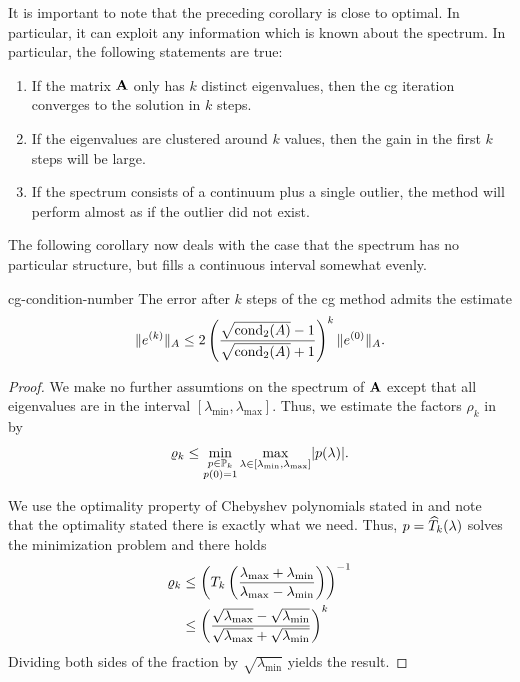 \begin{remark}
  It is important to note that the preceding corollary is close to
  optimal. In particular, it can exploit any information which is
  known about the spectrum. In particular, the following statements are true:
  \begin{enumerate}
  \item If the matrix $\mathbf A$ only has $k$ distinct eigenvalues, then
    the cg iteration converges to the solution in $k$ steps.
  \item If the eigenvalues are clustered around $k$ values, then the
    gain in the first $k$ steps will be large.
  \item If the spectrum consists of a continuum plus a single outlier,
    the method will perform almost as if the outlier did not exist.
  \end{enumerate}
  The following corollary now deals with the case that the spectrum
  has no particular structure, but fills a continuous interval
  somewhat evenly.
\end{remark}

\begin{Corollary}{cg-condition-number}
  The error after $k$ steps of the cg method admits the estimate
  \begin{gather}
    \lVert e^{(k)}\rVert_A \le 2 \left(
      \frac{\sqrt{\operatorname{cond}_2(A)}-1}{\sqrt{\operatorname{cond}_2(A)}+1}\right)^k
    \lVert e^{(0)}\rVert_A.
  \end{gather}
\end{Corollary}

\begin{proof}
  We make no further assumtions on the spectrum of $\mathbf A$ except that
  all eigenvalues are in the interval
  $[\lambda_{\min},\lambda_{\max}]$. Thus, we estimate the factors $\rho_k$ in  by
  \begin{gather}
    \varrho_k \le \min_{\substack{p\in\mathbb P_k\\p(0) = 1}}
    \max_{\lambda\in[\lambda_{\min},\lambda_{\max}]} \lvert p(\lambda)\rvert.
  \end{gather}
  
  We use the optimality property of Chebyshev polynomials stated in
   and note that the
  optimality stated there is exactly what we need. Thus,
  $p = \widehat{T}_k(\lambda)$ solves the minimization
  problem and there holds
  \begin{align}
    \varrho_k
    &\le \left(T_k\left(
      \frac{\lambda_{\max}+\lambda_{\min}}{\lambda_{\max}-\lambda_{\min}}
      \right)\right)^{-1}\\
    & \le \left(\frac{\sqrt{\lambda_{\max}}-\sqrt{\lambda_{\min}}}{\sqrt{\lambda_{\max}}+\sqrt{\lambda_{\min}}}
      \right)^k
  \end{align}
  Dividing both sides of the fraction by $\sqrt{\lambda_{\min}}$ yields the result.
\end{proof}

